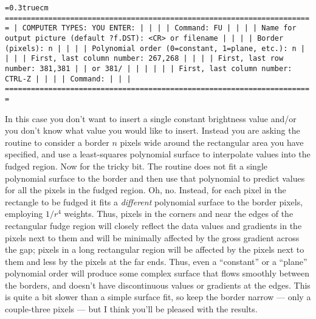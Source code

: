 \vfill
\eject
{\noindent\obeylines\obeyspaces\frenchspacing\tt\baselineskip=0.3truecm
=======================================================================
| COMPUTER TYPES:                                  YOU ENTER:         |
|                                                                     |
| Command:                                         FU                 |
|                                                                     |
|     Name for output picture (default ?f.DST):    <CR> or filename   |
|                                                                     |
|                              Border (pixels):    n                  |
|                                                                     |
| Polynomial order (0=constant, 1=plane, etc.):    n                  |
|                                                                     |
|                    First, last column number:    267,268            |
|                                                                     |
|                       First, last row number:    381,381            |
|                                               or 381/               |
|                                                                     |
|                                                                     |
|                    First, last column number:    CTRL-Z             |
|                                                                     |
| Command:                                                            |
|                                                                     |
=======================================================================
}
\bigskip

In this case you don't want to insert a single constant brightness
value and/or you don't know what value you would like to insert.
Instead you are asking the routine to consider a border $n$ pixels wide
around the rectangular area you have specified, and use a least-squares
polynomial surface to interpolate values into the fudged region.  Now
for the tricky bit.  The routine does not fit a single polynomial
surface to the border and then use that polynomial to predict values
for all the pixels in the fudged region.  Oh, no.  Instead, for each
pixel in the rectangle to be fudged it fits a {\it different\/}
polynomial surface to the border pixels, employing $1/r^4$ weights.
Thus, pixels in the corners and near the edges of the rectangular fudge
region will closely reflect the data values and gradients in the pixels
next to them and will be minimally affected by the gross gradient
across the gap; pixels in a long rectangular region will be affected by
the pixels next to them and less by the pixels at the far ends.  Thus,
even a ``constant'' or a ``plane'' polynomial order will produce some
complex surface that flows smoothly between the borders, and doesn't
have discontinuous values or gradients at the edges.  This is quite a
bit slower than a simple surface fit, so keep the border narrow ---
only a couple-three pixels --- but I think you'll be pleased with the
results.

